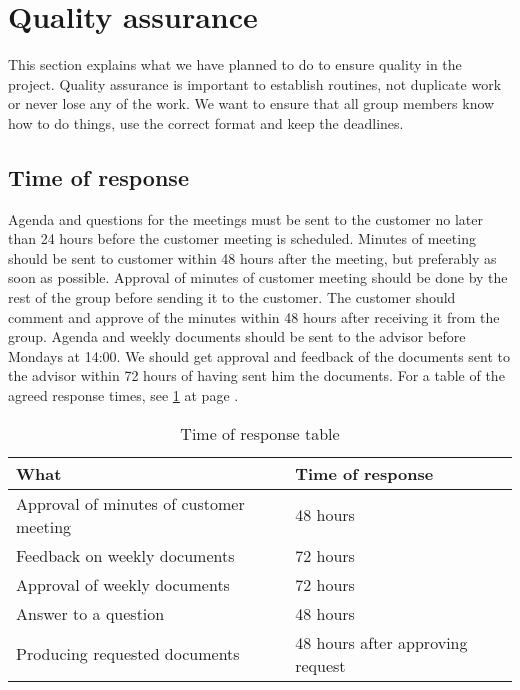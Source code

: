 \section{Quality assurance}
This section explains what we have planned to do to ensure quality in the project. Quality assurance is important to establish routines, not duplicate work or never lose any of the work. We want to ensure that all group members know how to do things, use the correct format and keep the deadlines.

\subsection{Time of response}
Agenda and questions for the meetings must be sent to the customer no later than 24 hours before the customer meeting is scheduled. 
Minutes of meeting should be sent to customer within 48 hours after the meeting, but preferably as soon as possible.
Approval of minutes of customer meeting should be done by the rest of the group before sending it to the customer. 
The customer should comment and approve of the minutes within 48 hours after receiving it from the group. 
Agenda and weekly documents should be sent to the advisor before Mondays at 14:00.
We should get approval and feedback of the documents sent to the advisor within 72 hours of having sent him the documents.
\newline
\newline
For a table of the agreed response times, see \ref{tab:responsetable} at page \pageref{tab:responsetable}.

\begin{table}[hbt]
\begin{center}
\begin{tabular}{l|l} \hline
\textbf{What} & \textbf{Time of response} \\ \hline \hline
Approval of minutes of customer meeting & 48 hours \\
Feedback on weekly documents & 72 hours \\
Approval of weekly documents & 72 hours \\
Answer to a question & 48 hours \\
Producing requested documents & 48 hours after approving request \\ \hline
\end{tabular}
\end{center}
\caption{Time of response table}\label{tab:responsetable}
\end{table}


